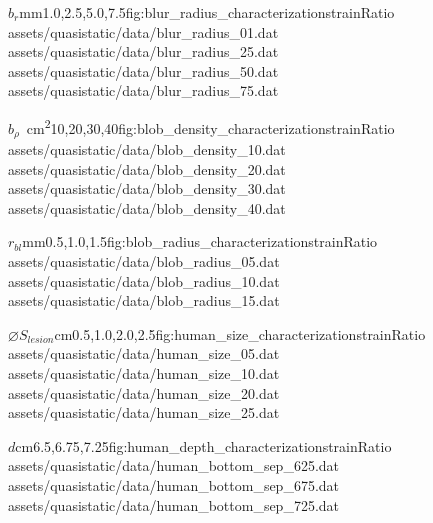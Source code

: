 \begin{multicols}{2}
			\characterizationDataTable%
				{$b_r$}{mm}{1.0,2.5,5.0,7.5}{fig:blur_radius_characterization}{strainRatio}%
				{assets/quasistatic/data/blur_radius_01.dat}%
				{assets/quasistatic/data/blur_radius_25.dat}%
				{assets/quasistatic/data/blur_radius_50.dat}%
				{assets/quasistatic/data/blur_radius_75.dat}

			\characterizationDataTable%
				{$b_\rho$}{\si{\per\cm\squared}}{10,20,30,40}{fig:blob_density_characterization}{strainRatio}%
				{assets/quasistatic/data/blob_density_10.dat}%
				{assets/quasistatic/data/blob_density_20.dat}%
				{assets/quasistatic/data/blob_density_30.dat}%
				{assets/quasistatic/data/blob_density_40.dat}

			\characterizationDataTable%
				{$r_{bl}$}{mm}{0.5,1.0,1.5}{fig:blob_radius_characterization}{strainRatio}%
				{assets/quasistatic/data/blob_radius_05.dat}%
				{assets/quasistatic/data/blob_radius_10.dat}%
				{assets/quasistatic/data/blob_radius_15.dat}%
				{}

			\characterizationDataTable%
				{$\diameter S_{lesion}$}{cm}{0.5,1.0,2.0,2.5}{fig:human_size_characterization}{strainRatio}%
				{assets/quasistatic/data/human_size_05.dat}%
				{assets/quasistatic/data/human_size_10.dat}%
				{assets/quasistatic/data/human_size_20.dat}%
				{assets/quasistatic/data/human_size_25.dat}

			\characterizationDataTable%
				{$d$}{cm}{6.5,6.75,7.25}{fig:human_depth_characterization}{strainRatio}%
				{assets/quasistatic/data/human_bottom_sep_625.dat}%
				{assets/quasistatic/data/human_bottom_sep_675.dat}%
				{assets/quasistatic/data/human_bottom_sep_725.dat}%
				{}
		\end{multicols}

